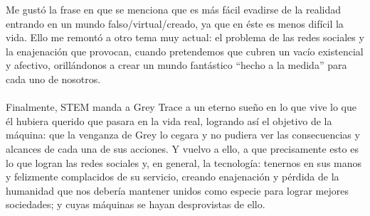 \documentclass[letterpaper,12pt]{article} %
\begin{document}
	\hfill \break	
	Me gustó la frase en que se menciona que es más fácil evadirse de la realidad entrando en un mundo falso/virtual/creado, ya que en éste es menos difícil la vida. Ello me remontó a otro tema muy actual: el problema de las redes sociales y la enajenación que provocan, cuando pretendemos que cubren un vacío existencial y afectivo, orillándonos a crear un mundo fantástico “hecho a la medida” para cada uno de nosotros. \\ \\
	Finalmente, STEM manda a Grey Trace a un eterno sueño en lo que vive lo que él hubiera querido que pasara en la vida real, logrando así el objetivo de la máquina: que la venganza de Grey lo cegara y no pudiera ver las consecuencias y alcances de cada una de sus acciones. Y vuelvo a ello, a que precisamente esto es lo que logran las redes sociales y, en general, la tecnología: tenernos en sus manos y felizmente complacidos de su servicio, creando enajenación y pérdida de la humanidad que nos debería mantener unidos como especie para lograr mejores sociedades; y cuyas máquinas se hayan desprovistas de ello.
\end{document}
